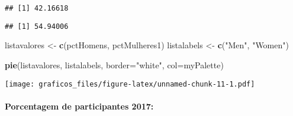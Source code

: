 \documentclass[
]{article}
\newenvironment{Shaded}{\begin{snugshade}}{\end{snugshade}}
\newcommand{\DataTypeTok}[1]{\textcolor[rgb]{0.13,0.29,0.53}{#1}}
\newcommand{\DecValTok}[1]{\textcolor[rgb]{0.00,0.00,0.81}{#1}}
\newcommand{\KeywordTok}[1]{\textcolor[rgb]{0.13,0.29,0.53}{\textbf{#1}}}
\newcommand{\NormalTok}[1]{#1}
\newcommand{\OperatorTok}[1]{\textcolor[rgb]{0.81,0.36,0.00}{\textbf{#1}}}
\newcommand{\StringTok}[1]{\textcolor[rgb]{0.31,0.60,0.02}{#1}}
\begin{document}
\begin{verbatim}
## [1] 42.16618
\end{verbatim}

\begin{Shaded}
\end{Shaded}

\begin{verbatim}
## [1] 54.94006
\end{verbatim}

\begin{Shaded}
\begin{Highlighting}[]
\NormalTok{listavalores <-}\StringTok{ }\KeywordTok{c}\NormalTok{(pctHomens, pctMulheres1)}
\NormalTok{listalabels <-}\StringTok{ }\KeywordTok{c}\NormalTok{(}\StringTok{"Men"}\NormalTok{, }\StringTok{"Women"}\NormalTok{)}

\KeywordTok{pie}\NormalTok{(listavalores, listalabels, }\DataTypeTok{border=}\StringTok{"white"}\NormalTok{, }\DataTypeTok{col=}\NormalTok{myPalette)}
\end{Highlighting}
\end{Shaded}

\texttt{[image: graficos\_files/figure-latex/unnamed-chunk-11-1.pdf]}

\hypertarget{porcentagem-de-participantes-2017}{%
\paragraph{Porcentagem de participantes
2017:}\label{porcentagem-de-participantes-2017}}

\begin{Shaded}
\end{Shaded}
\end{document}
